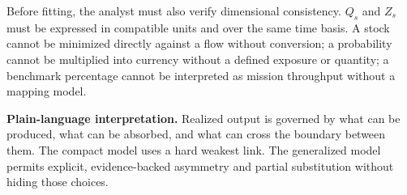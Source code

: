 Before fitting, the analyst must also verify dimensional consistency. $Q_s$ and $Z_s$ must be expressed in compatible units and over the same time basis. A stock cannot be minimized directly against a flow without conversion; a probability cannot be multiplied into currency without a defined exposure or quantity; a benchmark percentage cannot be interpreted as mission throughput without a mapping model.

\begin{methodbox}
\textbf{Plain-language interpretation.} Realized output is governed by what can be produced, what can be absorbed, and what can cross the boundary between them. The compact model uses a hard weakest link. The generalized model permits explicit, evidence-backed asymmetry and partial substitution without hiding those choices.
\end{methodbox}
